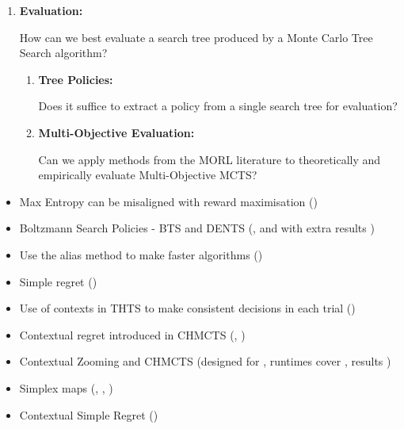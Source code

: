 \begin{enumerate}[start=1, label={\textbf{Q\arabic* -}}]
        \item \hypertarget{q3}{\textbf{Evaluation:}} How can we best evaluate a search tree produced by a Monte Carlo Tree Search algorithm?
        
        \begin{enumerate}[start=1, label={\textbf{Q3.\arabic* -}}]
            \item \hypertarget{q31}{\textbf{Tree Policies:}} Does it suffice to extract a policy from a single search tree for evaluation? 
            \item \hypertarget{q32}{\textbf{Multi-Objective Evaluation:}} Can we apply methods from the MORL literature to theoretically and empirically evaluate Multi-Objective MCTS?
        \end{enumerate}
    \end{enumerate}

    \begin{itemize}
        \item Max Entropy can be misaligned with reward maximisation (\entropyq)
        \item Boltzmann Search Policies - BTS and DENTS (\entropyq, and with extra results \treepolicyq)
        \item Use the alias method to make faster algorithms (\complexityq)
        \item Simple regret (\exploreq)
        \item Use of contexts in THTS to make consistent decisions in each trial (\contextq)
        \item Contextual regret introduced in CHMCTS (\moscalabilityq, \moevalq)
        \item Contextual Zooming and CHMCTS (designed for \contextq, runtimes cover \dimq, results \moevalq)
        \item Simplex maps (\contextq, \moscalabilityq, \dimq)
        \item Contextual Simple Regret (\moevalq)
    \end{itemize}


